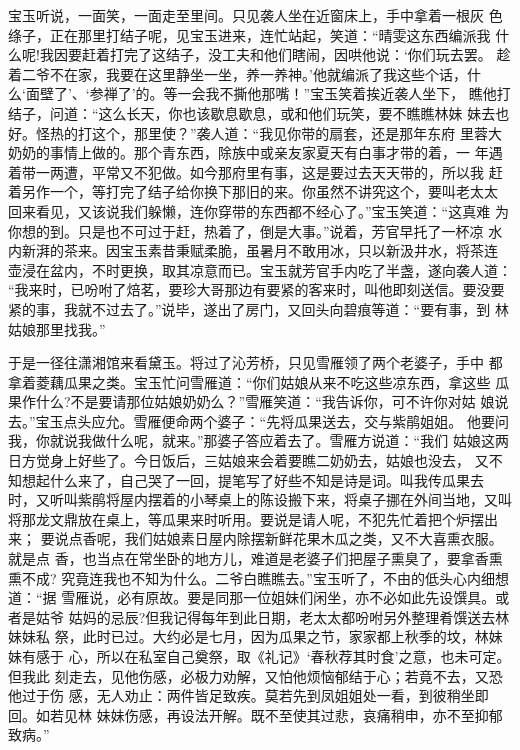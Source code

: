 宝玉听说，一面笑，一面走至里间。只见袭人坐在近窗床上，手中拿着一根灰
色绦子，正在那里打结子呢，见宝玉进来，连忙站起，笑道：“晴雯这东西编派我
什么呢!我因要赶着打完了这结子，没工夫和他们瞎闹，因哄他说：‘你们玩去罢。
趁着二爷不在家，我要在这里静坐一坐，养一养神。’他就编派了我这些个话，什
么‘面壁了’、‘参禅了’的。等一会我不撕他那嘴！”宝玉笑着挨近袭人坐下，
瞧他打结子，问道：“这么长天，你也该歇息歇息，或和他们玩笑，要不瞧瞧林妹
妹去也好。怪热的打这个，那里使？”袭人道：“我见你带的扇套，还是那年东府
里蓉大奶奶的事情上做的。那个青东西，除族中或亲友家夏天有白事才带的着，一
年遇着带一两遭，平常又不犯做。如今那府里有事，这是要过去天天带的，所以我
赶着另作一个，等打完了结子给你换下那旧的来。你虽然不讲究这个，要叫老太太
回来看见，又该说我们躲懒，连你穿带的东西都不经心了。”宝玉笑道：“这真难
为你想的到。只是也不可过于赶，热着了，倒是大事。”说着，芳官早托了一杯凉
水内新湃的茶来。因宝玉素昔秉赋柔脆，虽暑月不敢用冰，只以新汲井水，将茶连
壶浸在盆内，不时更换，取其凉意而已。宝玉就芳官手内吃了半盏，遂向袭人道：
“我来时，已吩咐了焙茗，要珍大哥那边有要紧的客来时，叫他即刻送信。要没要
紧的事，我就不过去了。”说毕，遂出了房门，又回头向碧痕等道：“要有事，到
林姑娘那里找我。”

于是一径往潇湘馆来看黛玉。将过了沁芳桥，只见雪雁领了两个老婆子，手中
都拿着菱藕瓜果之类。宝玉忙问雪雁道：“你们姑娘从来不吃这些凉东西，拿这些
瓜果作什么?不是要请那位姑娘奶奶么？”雪雁笑道：“我告诉你，可不许你对姑
娘说去。”宝玉点头应允。雪雁便命两个婆子：“先将瓜果送去，交与紫鹃姐姐。
他要问我，你就说我做什么呢，就来。”那婆子答应着去了。雪雁方说道：“我们
姑娘这两日方觉身上好些了。今日饭后，三姑娘来会着要瞧二奶奶去，姑娘也没去，
又不知想起什么来了，自己哭了一回，提笔写了好些不知是诗是词。叫我传瓜果去
时，又听叫紫鹃将屋内摆着的小琴桌上的陈设搬下来，将桌子挪在外间当地，又叫
将那龙文鼎放在桌上，等瓜果来时听用。要说是请人呢，不犯先忙着把个炉摆出来；
要说点香呢，我们姑娘素日屋内除摆新鲜花果木瓜之类，又不大喜熏衣服。就是点
香，也当点在常坐卧的地方儿，难道是老婆子们把屋子熏臭了，要拿香熏熏不成?
究竟连我也不知为什么。二爷白瞧瞧去。”宝玉听了，不由的低头心内细想道：“据
雪雁说，必有原故。要是同那一位姐妹们闲坐，亦不必如此先设馔具。或者是姑爷
姑妈的忌辰?但我记得每年到此日期，老太太都吩咐另外整理肴馔送去林妹妹私
祭，此时已过。大约必是七月，因为瓜果之节，家家都上秋季的坟，林妹妹有感于
心，所以在私室自己奠祭，取《礼记》‘春秋荐其时食’之意，也未可定。但我此
刻走去，见他伤感，必极力劝解，又怕他烦恼郁结于心；若竟不去，又恐他过于伤
感，无人劝止：两件皆足致疾。莫若先到凤姐姐处一看，到彼稍坐即回。如若见林
妹妹伤感，再设法开解。既不至使其过悲，哀痛稍申，亦不至抑郁致病。”

